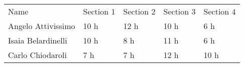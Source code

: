 
\begin{center}
    \begin{tabu}{|X[1.5]|X|X|X|X|} \hline \everyrow{\hline}
        Name & Section 1 & Section 2 & Section 3 & Section 4 \\ 
        Angelo Attivissimo & 10 h & 12 h & 10 h & 6 h \\
        Isaia Belardinelli & 10 h & 8 h & 11 h & 6 h \\
        Carlo Chiodaroli & 7 h & 7 h & 12 h & 10 h \\ 
    \end{tabu}
\end{center}